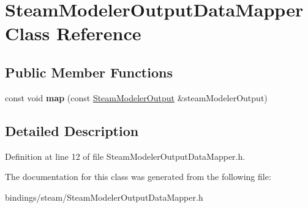 \hypertarget{class_steam_modeler_output_data_mapper}{}\section{Steam\+Modeler\+Output\+Data\+Mapper Class Reference}
\label{class_steam_modeler_output_data_mapper}
\subsection*{Public Member Functions}
\begin{DoxyCompactItemize}
\item 
\mbox{\label{class_steam_modeler_output_data_mapper_a615d54344bedc05742854e4b134b6e0f}} 
const void {\bfseries map} (const \hyperlink{class_steam_modeler_output}{Steam\+Modeler\+Output} \&steam\+Modeler\+Output)
\end{DoxyCompactItemize}


\subsection{Detailed Description}


Definition at line 12 of file Steam\+Modeler\+Output\+Data\+Mapper.\+h.



The documentation for this class was generated from the following file\+:\begin{DoxyCompactItemize}
\item 
bindings/steam/Steam\+Modeler\+Output\+Data\+Mapper.\+h\end{DoxyCompactItemize}
